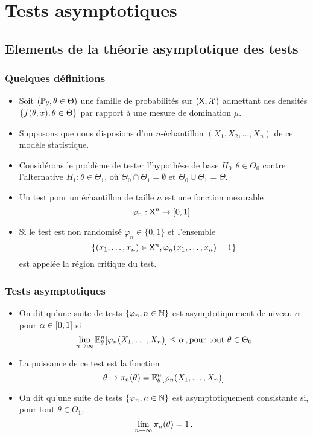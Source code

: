 \section{Tests asymptotiques}
\subsection{Elements de la théorie asymptotique des tests}
\begin{frame}
\frametitle{Quelques définitions}
\begin{itemize}
\item Soit $(\operatorname{{\mathbb P}}_\theta, \theta \in \Theta)$ une famille de probabilités sur $(\mathsf{X},\mathcal{X})$ admettant des densités $\{ f(\theta,x), \theta \in \Theta \}$ par rapport à une mesure de domination $\mu$.
\item Supposons que nous disposions d'un $n$-échantillon $(X_1,X_2,\dots, X_n)$ de ce modèle statistique.
\item Considérons le problème de tester l'hypothèse de base $H_0: \theta \in \Theta_0$ contre l'alternative $H_1: \theta \in \Theta_1$, où $\Theta_0 \cap \Theta_1= \emptyset$ et $\Theta_0 \cup \Theta_1= \Theta$.
\item Un \alert{test} pour un échantillon de taille $n$ est une  fonction mesurable
\[
\varphi_n : \mathsf{X}^n \to \left[0,1\right] \,.
\]
\item Si le test est \alert{non randomisé} $\varphi_n \in \{0,1\}$ et l'ensemble
\[
\{ (x_1,\dots, x_n) \in \mathsf{X}^n, \varphi_n(x_1,\dots,x_n)= 1\}
\]
est appelée la \alert{région critique du test}.
\end{itemize}
\end{frame}

\begin{frame}
\frametitle{Tests asymptotiques}
\begin{itemize}
\item  On dit qu'une suite de  tests $\{\varphi_n, n \in \mathbb{N}\}$ est \alert{asymptotiquement de niveau $\alpha$} pour $\alpha \in \left[0,1\right]$ si
\alert{
\[
\lim_{n \to \infty} \operatorname{{\mathbb E}}^n_\theta[ \varphi_n(X_1,\dots,X_n)] \leq \alpha \,, \text{pour tout $\theta \in \Theta_0$}
\]
}
\item La puissance de ce test est la fonction
\[
\theta \mapsto \pi_n(\theta)= \operatorname{{\mathbb E}}^n_{\theta}[ \varphi_n(X_1,\dots,X_n)]
\]
\item On dit qu'une suite de tests $\{\varphi_n, n \in \mathbb{N}\}$ est asymptotiquement \alert{consistante} si, pour tout $\theta \in \Theta_1$,
\alert{
\[
\lim_{n \to \infty} \pi_n(\theta) = 1 \,.
\]
}
\end{itemize}
\end{frame}

